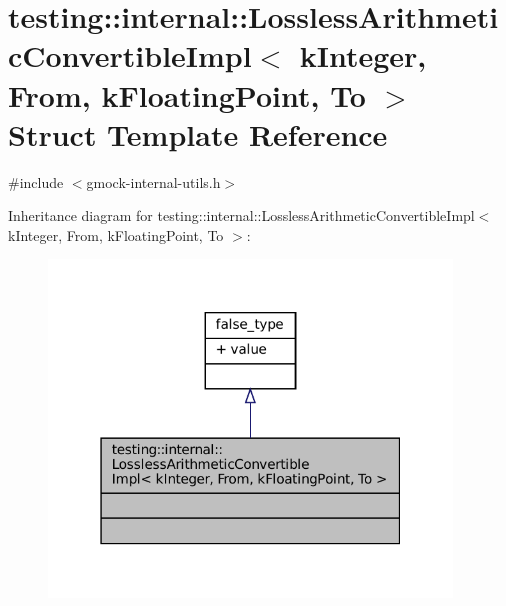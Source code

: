 \hypertarget{structtesting_1_1internal_1_1LosslessArithmeticConvertibleImpl_3_01kInteger_00_01From_00_01kFloatingPoint_00_01To_01_4}{}\section{testing\+:\+:internal\+:\+:Lossless\+Arithmetic\+Convertible\+Impl$<$ k\+Integer, From, k\+Floating\+Point, To $>$ Struct Template Reference}
\label{structtesting_1_1internal_1_1LosslessArithmeticConvertibleImpl_3_01kInteger_00_01From_00_01kFloatingPoint_00_01To_01_4}


{\ttfamily \#include $<$gmock-\/internal-\/utils.\+h$>$}



Inheritance diagram for testing\+:\+:internal\+:\+:Lossless\+Arithmetic\+Convertible\+Impl$<$ k\+Integer, From, k\+Floating\+Point, To $>$\+:
\nopagebreak
\begin{figure}[H]
\begin{center}
\leavevmode
\includegraphics[width=304pt]{structtesting_1_1internal_1_1LosslessArithmeticConvertibleImpl_3_01kInteger_00_01From_00_01kFloa97ddcd9ae12df44342db9501f8d5ac86}
\end{center}
\end{figure}


